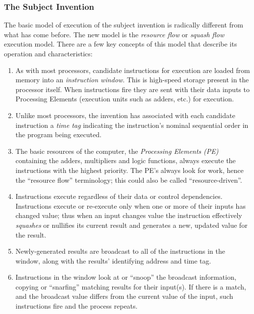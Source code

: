 \documentclass[10pt,dvips]{article}
\begin{document}
\subsubsection{The Subject Invention}
The basic model of execution of the subject invention is radically different
from what has come before. The new model is the {\it resource flow} or
{\it squash flow} execution model. There are a few key concepts of
this model that describe its operation and characteristics:
\begin{enumerate}
\item As with most processors, candidate instructions for execution are loaded from
memory into an {\it instruction window}. This is high-speed storage present in the
processor itself. When instructions fire they are sent with their data inputs to
Processing Elements (execution units such as adders, etc.) for execution.

\item Unlike most processors, the invention has associated with each candidate
instruction a {\it time tag} indicating the instruction's nominal sequential order
in the program being executed.

\item The basic resources of the computer, the {\it Processing Elements (PE)}
containing the adders, multipliers and logic functions, always execute the
instructions with the highest priority. The PE's always look for work, hence
the ``resource flow'' terminology; this could also be called ``resource-driven''.

\item Instructions execute regardless of their data or control dependencies.
Instructions execute or re-execute only when one or more of their inputs has changed
value; thus when an input changes value the instruction effectively {\it squashes}
or nullifies its current result and generates a new, updated value for the result.

\item Newly-generated results are broadcast to all of the instructions in the
window, along with the results' identifying address and time tag.

\item Instructions in the window look at or ``snoop'' the broadcast information,
copying or ``snarfing'' matching results for their input(s). If there is a match,
and the broadcast value differs from the current value of the input,
such instructions fire and the process repeats.
\end{enumerate}
\end{document}
